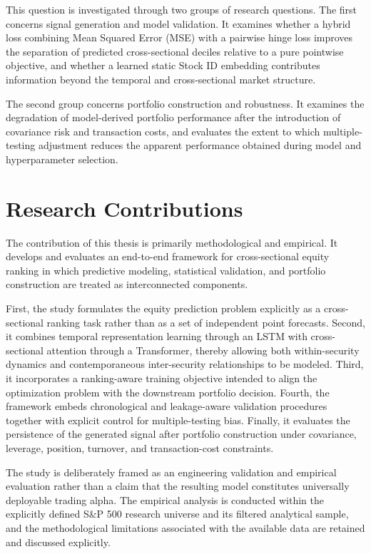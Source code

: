 This question is investigated through two groups of research questions. The first concerns signal generation and model validation. It examines whether a hybrid loss combining Mean Squared Error (MSE) with a pairwise hinge loss improves the separation of predicted cross-sectional deciles relative to a pure pointwise objective, and whether a learned static Stock ID embedding contributes information beyond the temporal and cross-sectional market structure.

\medskip

The second group concerns portfolio construction and robustness. It examines the degradation of model-derived portfolio performance after the introduction of covariance risk and transaction costs, and evaluates the extent to which multiple-testing adjustment reduces the apparent performance obtained during model and hyperparameter selection.

\section{Research Contributions}
The contribution of this thesis is primarily methodological and empirical. It develops and evaluates an end-to-end framework for cross-sectional equity ranking in which predictive modeling, statistical validation, and portfolio construction are treated as interconnected components.

\medskip

First, the study formulates the equity prediction problem explicitly as a cross-sectional ranking task rather than as a set of independent point forecasts. Second, it combines temporal representation learning through an LSTM with cross-sectional attention through a Transformer, thereby allowing both within-security dynamics and contemporaneous inter-security relationships to be modeled. Third, it incorporates a ranking-aware training objective intended to align the optimization problem with the downstream portfolio decision. Fourth, the framework embeds chronological and leakage-aware validation procedures together with explicit control for multiple-testing bias. Finally, it evaluates the persistence of the generated signal after portfolio construction under covariance, leverage, position, turnover, and transaction-cost constraints.

\medskip

The study is deliberately framed as an engineering validation and empirical evaluation rather than a claim that the resulting model constitutes universally deployable trading alpha. The empirical analysis is conducted within the explicitly defined S\&P 500 research universe and its filtered analytical sample, and the methodological limitations associated with the available data are retained and discussed explicitly.

